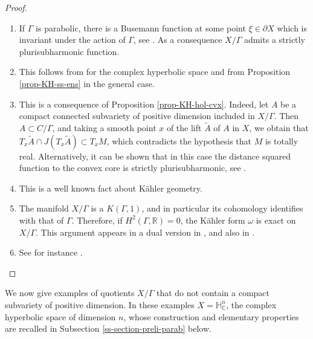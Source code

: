 \documentclass{article}
\theoremstyle{definition}
\theoremstyle{remark}
\newcommand{\C}{\mathbb{C}}
\newcommand{\R}{\mathbb{R}}
\newcommand{\HNC}{\mathbb{H}^{n}_{\C}}
\begin{document}
	\begin{proof}\begin{enumerate}[leftmargin=*,label=(\alph*)]
			\item If $\Gamma$ is parabolic, there is a Busemann function at some point $\xi\in \partial X$ which is invariant under the action of $\Gamma$, see \cite[Proposition 7.8]{eberleinVisibilityManifolds1973}. As a consequence $X/\Gamma$ admits a strictly plurisubharmonic function.
			\item This follows from \cite{deyNoteComplexhyperbolicKleinian2020} for the complex hyperbolic space and from Proposition \ref{prop-KH-ss-ens} in the general case.
			\item This is a consequence of Proposition \ref{prop-KH-hol-cvx}. Indeed, let $A$ be a compact connected subvariety of positive dimension included in $X/\Gamma$. Then $A\subset C/\Gamma$, and taking a smooth point $x$ of the lift $\tilde{A}$ of $A$ in $X$, we obtain that $T_x\tilde{A}\cap J(T_x\tilde{A}) \subset T_xM$, which contradicts the hypothesis that $M$ is totally real. Alternatively, it  can be shown that in this case the distance squared function to the convex core is strictly plurisubharmonic, see \cite{chenDiscreteGroupsHolomorphic2013}.
			\item This is a well known fact about Kähler geometry.
			\item The manifold $X/\Gamma$ is a $K(\Gamma,1)$, and in particular its cohomology identifies with that of $\Gamma$. Therefore, if $H^{2}(\Gamma,\R)=0$, the Kähler form $\omega$ is exact on $X/\Gamma$. This argument appears in a dual version in \cite[Lemma 4.2]{miebachSchottkyGroupActions2018}, and also in \cite[page 27]{kapovichSurveyComplexHyperbolic2022}.
			\item See for instance \cite[Proof of Theorem 1.5]{connellNaturalFlowCritical2023}.\qedhere
		\end{enumerate}
	\end{proof}
	We now give examples of quotients $X/\Gamma$ that do not contain a compact subvariety of positive dimension. In these examples $X=\HNC$, the complex hyperbolic space of dimension $n$, whose construction and elementary properties are recalled in Subsection \ref{ss-section-preli-parab} below.
\end{document}
